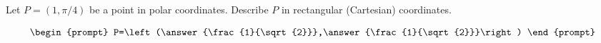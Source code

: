 \documentclass{ximera}
\author{Gregory Hartman \and Matthew Carr}
\begin{document}
\begin{exercise}





Let $P=(1,\pi/4)$ be a point in polar coordinates. Describe $P$ in rectangular (Cartesian) coordinates.

\[
\begin{prompt}
P=\left(\answer{\frac{1}{\sqrt{2}}},\answer{\frac{1}{\sqrt{2}}}\right)
\end{prompt}
\]

\end{exercise}
\end{document}
